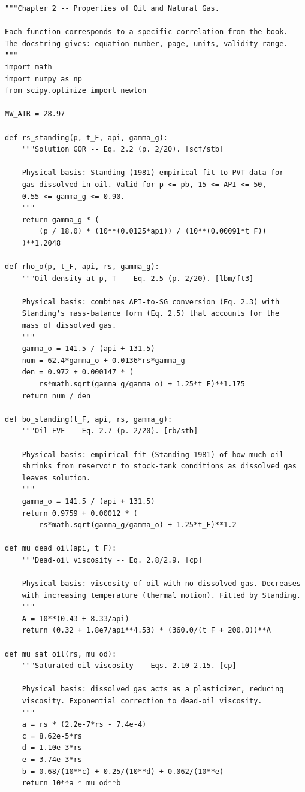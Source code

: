 \documentclass[11pt,a4paper,openany]{book}
\begin{document}
\begin{lstlisting}
"""Chapter 2 -- Properties of Oil and Natural Gas.

Each function corresponds to a specific correlation from the book.
The docstring gives: equation number, page, units, validity range.
"""
import math
import numpy as np
from scipy.optimize import newton

MW_AIR = 28.97

def rs_standing(p, t_F, api, gamma_g):
    """Solution GOR -- Eq. 2.2 (p. 2/20). [scf/stb]

    Physical basis: Standing (1981) empirical fit to PVT data for
    gas dissolved in oil. Valid for p <= pb, 15 <= API <= 50,
    0.55 <= gamma_g <= 0.90.
    """
    return gamma_g * (
        (p / 18.0) * (10**(0.0125*api)) / (10**(0.00091*t_F))
    )**1.2048

def rho_o(p, t_F, api, rs, gamma_g):
    """Oil density at p, T -- Eq. 2.5 (p. 2/20). [lbm/ft3]

    Physical basis: combines API-to-SG conversion (Eq. 2.3) with
    Standing's mass-balance form (Eq. 2.5) that accounts for the
    mass of dissolved gas.
    """
    gamma_o = 141.5 / (api + 131.5)
    num = 62.4*gamma_o + 0.0136*rs*gamma_g
    den = 0.972 + 0.000147 * (
        rs*math.sqrt(gamma_g/gamma_o) + 1.25*t_F)**1.175
    return num / den

def bo_standing(t_F, api, rs, gamma_g):
    """Oil FVF -- Eq. 2.7 (p. 2/20). [rb/stb]

    Physical basis: empirical fit (Standing 1981) of how much oil
    shrinks from reservoir to stock-tank conditions as dissolved gas
    leaves solution.
    """
    gamma_o = 141.5 / (api + 131.5)
    return 0.9759 + 0.00012 * (
        rs*math.sqrt(gamma_g/gamma_o) + 1.25*t_F)**1.2

def mu_dead_oil(api, t_F):
    """Dead-oil viscosity -- Eq. 2.8/2.9. [cp]

    Physical basis: viscosity of oil with no dissolved gas. Decreases
    with increasing temperature (thermal motion). Fitted by Standing.
    """
    A = 10**(0.43 + 8.33/api)
    return (0.32 + 1.8e7/api**4.53) * (360.0/(t_F + 200.0))**A

def mu_sat_oil(rs, mu_od):
    """Saturated-oil viscosity -- Eqs. 2.10-2.15. [cp]

    Physical basis: dissolved gas acts as a plasticizer, reducing
    viscosity. Exponential correction to dead-oil viscosity.
    """
    a = rs * (2.2e-7*rs - 7.4e-4)
    c = 8.62e-5*rs
    d = 1.10e-3*rs
    e = 3.74e-3*rs
    b = 0.68/(10**c) + 0.25/(10**d) + 0.062/(10**e)
    return 10**a * mu_od**b


\end{lstlisting}
\end{document}
